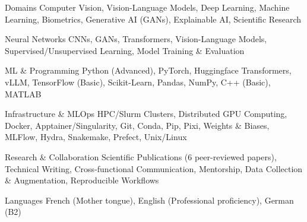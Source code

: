 

\begin{cvskills}

  \cvskill
    {Domains} %
    {Computer Vision, Vision-Language Models, Deep Learning, Machine Learning, Biometrics, Generative AI (GANs), Explainable AI, Scientific Research} %

  \cvskill
    {Neural Networks} %
    {CNNs, GANs, Transformers, Vision-Language Models, Supervised/Unsupervised Learning, Model Training \& Evaluation} %

  \cvskill
    {ML \& Programming} %
    {Python (Advanced), PyTorch, Huggingface Transformers, vLLM, TensorFlow (Basic), Scikit-Learn, Pandas, NumPy, C++ (Basic), MATLAB} %

  \cvskill
    {Infrastructure \& MLOps} %
    {HPC/Slurm Clusters, Distributed GPU Computing, Docker, Apptainer/Singularity, Git, Conda, Pip, Pixi, Weights \& Biases, MLFlow, Hydra, Snakemake, Prefect, Unix/Linux} %

  \cvskill
    {Research \& Collaboration} %
    {Scientific Publications (6 peer-reviewed papers), Technical Writing, Cross-functional Communication, Mentorship, Data Collection \& Augmentation, Reproducible Workflows} %

  \cvskill
    {Languages} %
    {French (Mother tongue), English (Professional proficiency), German (B2)} %

\end{cvskills}
